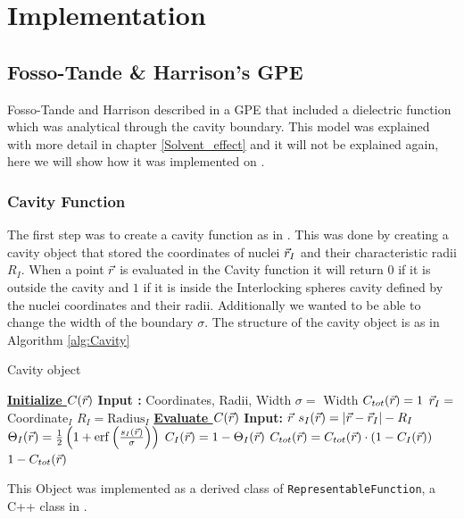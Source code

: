 \documentclass[../master_thesis.tex]{subfiles}
\begin{document}
\chapter{Implementation}\label{chap:implementation}
\section{Fosso-Tande \& Harrison's \ac{GPE}}
Fosso-Tande and Harrison described in \cite{FossoTande:2013ka} a \ac{GPE} that
included a dielectric function which was analytical through the cavity boundary.
This model was explained with more detail in chapter \ref{Solvent_effect} and
it will not be explained again, here we will show how it was implemented on
\mrchem.
\subsection{Cavity Function}
The first step was to create a cavity function as in \cite{FossoTande:2013ka}.
This was done by creating a cavity object that stored the coordinates of nuclei
$\vec{r}_I$ and their characteristic radii $R_I$. When a point $\vec{r}$ is evaluated
in the Cavity function it will return $0$ if it is outside the cavity and $1$ if
it is inside the Interlocking spheres cavity defined by the nuclei coordinates
and their radii. Additionally we wanted to be able to change the width of the
boundary $\sigma$. The structure of the cavity object is as in Algorithm \ref{alg:Cavity}

\begin{algorithm}
  \caption{Cavity object}\label{alg:Cavity}
  \begin{algorithmic}
    \STATE \underline{\textbf{Initialize $C(\vec{r})$}}
    \STATE \textbf{Input :} Coordinates, Radii, Width
    \STATE $\sigma = $ Width
    \STATE $C_{tot}(\vec{r}) = 1$
     \STATE $\vec{r}_I = $ Coordinate$_I$
     \STATE $R_I = \text{Radius}_I$
    \ENDFOR
    \STATE
    \STATE \underline{\textbf{Evaluate $C(\vec{r})$}}
    \STATE \textbf{Input: } $\vec{r}$
      \STATE $s_I(\vec{r}) = \abs{\vec{r} - \vec{r}_I} - R_I$
      \STATE $\Theta_I(\rvec) = \frac{1}{2}\left(1 + \erf\left(\frac{s_I(\rvec)}{\sigma}\right)\right)$
      \STATE $ C_I(\vec{r}) = 1 -\Theta_I(\vec{r}) $
      \STATE $ C_{tot}(\vec{r}) = C_{tot}(\vec{r}) \cdot (1 - C_{I}(\vec{r}))$
    \ENDFOR
    \RETURN $ 1 - C_{tot}(\vec{r})$
  \end{algorithmic}
\end{algorithm}
This Object was implemented as a derived class of \verb!RepresentableFunction!,
a C++ class in \mrchem.
\end{document}
